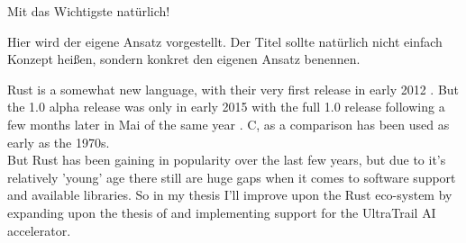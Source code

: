 Mit das Wichtigste natürlich!

Hier wird der eigene Ansatz vorgestellt. Der Titel sollte natürlich nicht einfach Konzept heißen, sondern konkret den eigenen Ansatz benennen.


%

Rust \cite{rustlang} is a somewhat new language,
with their very first release in early 2012 \cite{rust_releases}.
But the 1.0 alpha release was only in early 2015 \cite{rust_releases}
with the full 1.0 release following a few months later in Mai of the same year \cite{rust_releases}.
C, as a comparison has been used as early as the 1970s.\\
But Rust has been gaining in popularity \cite{rust_popularity} over the last few years, but
due to it's relatively 'young' age there still are huge gaps when it comes to software support and available libraries.
So in my thesis I'll improve upon the Rust eco-system by expanding upon the thesis of 
and implementing support for the UltraTrail \cite{ultratrail} AI accelerator.
